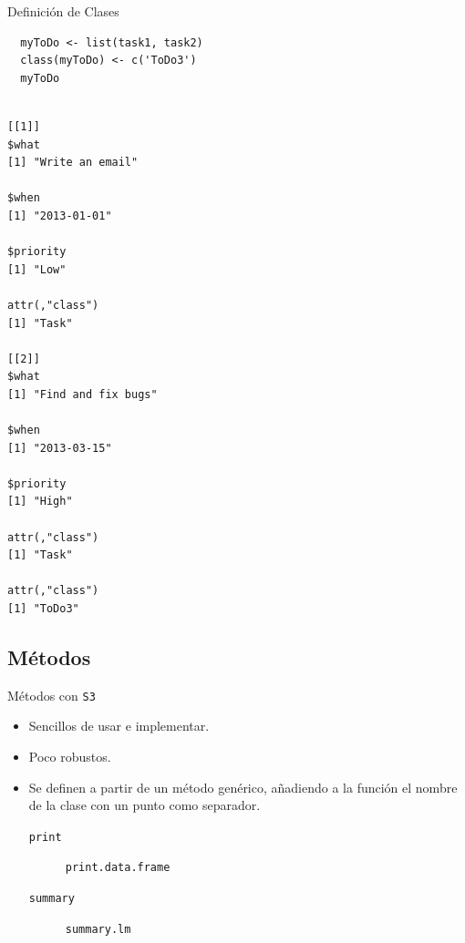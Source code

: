 \documentclass[xcolor={usenames,svgnames,dvipsnames}]{beamer}
\begin{document}
\begin{frame}[label={sec:orgc7faa80},fragile]{Definición de Clases}
 \lstset{language=r,label= ,caption= ,captionpos=b,numbers=none}
\begin{lstlisting}
  myToDo <- list(task1, task2)
  class(myToDo) <- c('ToDo3')
  myToDo
\end{lstlisting}

\begin{verbatim}

[[1]]
$what
[1] "Write an email"

$when
[1] "2013-01-01"

$priority
[1] "Low"

attr(,"class")
[1] "Task"

[[2]]
$what
[1] "Find and fix bugs"

$when
[1] "2013-03-15"

$priority
[1] "High"

attr(,"class")
[1] "Task"

attr(,"class")
[1] "ToDo3"
\end{verbatim}
\end{frame}

\subsection{Métodos}
\label{sec:orgc02c6e1}
\begin{frame}[label={sec:org2e35a8a},fragile]{Métodos con \texttt{S3}}
 \begin{itemize}
\item Sencillos de usar e implementar.
\item Poco robustos.
\item Se definen a partir de un método genérico, añadiendo a la función el nombre de la clase con un punto como separador. 
\begin{description}
\item[{\texttt{print}}] \texttt{print.data.frame}
\item[{\texttt{summary}}] \texttt{summary.lm}
\end{description}
\end{itemize}
\end{frame}
\end{document}
